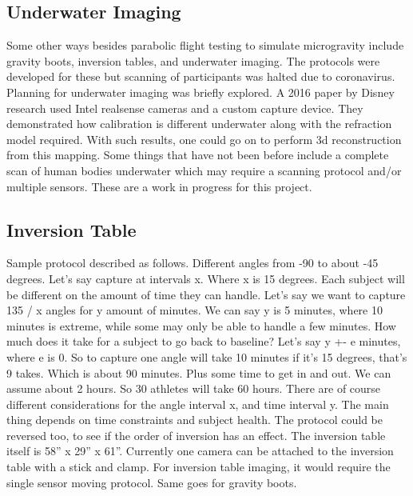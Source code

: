 \subsection{Underwater Imaging}
Some other ways besides parabolic flight testing to simulate microgravity include gravity boots, inversion tables, and underwater imaging. The protocols were developed for these but scanning of participants was halted due to coronavirus. Planning for underwater imaging was briefly explored. A 2016 paper by Disney research \cite{digumarti2016underwater} used Intel realsense cameras and a custom capture device. They demonstrated how calibration is different underwater along with the refraction model required. With such results, one could go on to perform 3d reconstruction from this mapping. Some things that have not been before include a complete scan of human bodies underwater which may require a scanning protocol and/or multiple sensors. These are a work in progress for this project.
\subsection{Inversion Table}
Sample protocol described as follows. Different angles from -90 to about -45 degrees. Let’s say capture at intervals x. Where x is 15 degrees. Each subject will be different on the amount of time they can handle. Let’s say we want to capture 135 / x angles for y amount of minutes. We can say y is 5 minutes, where 10 minutes is extreme, while some may only be able to handle a few minutes. How much does it take for a subject to go back to baseline? Let’s say y +- e minutes, where e is 0. So to capture one angle will take 10 minutes if it’s 15 degrees, that’s 9 takes. Which is about 90 minutes. Plus some time to get in and out. We can assume about 2 hours. So 30 athletes will take 60 hours. There are of course different considerations for the angle interval x, and time interval y. The main thing depends on time constraints and subject health. The protocol could be reversed too, to see if the order of inversion has an effect. The inversion table itself is 58” x 29” x 61”. Currently one camera can be attached to the inversion table with a stick and clamp. For inversion table imaging, it would require the single sensor moving protocol. Same goes for gravity boots. 

